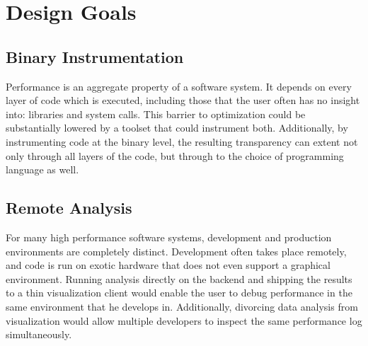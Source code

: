 \documentclass[annual]{acmsiggraph}
\begin{document}
\section{Design Goals}\label{ch_dg}

  \subsection{Binary Instrumentation}

  Performance is an aggregate property of a software system.
  It depends on every layer of code which is executed, including those that the user often has no insight into:
    libraries and system calls.
  This barrier to optimization could be substantially lowered by a toolset that could instrument both.
  Additionally, by instrumenting code at the binary level, the resulting transparency can extent not only through
    all layers of the code, but through to the choice of programming language as well.

  \subsection{Remote Analysis}

  For many high performance software systems, development and production environments are completely distinct.
  Development often takes place remotely, and code is run on exotic hardware that does not even support a graphical environment.
  Running analysis directly on the backend and shipping the results to a thin visualization client would enable 
    the user to debug performance in the same environment that he develops in.
  Additionally, divorcing data analysis from visualization would allow multiple developers to inspect the same performance
    log simultaneously.
\end{document}
